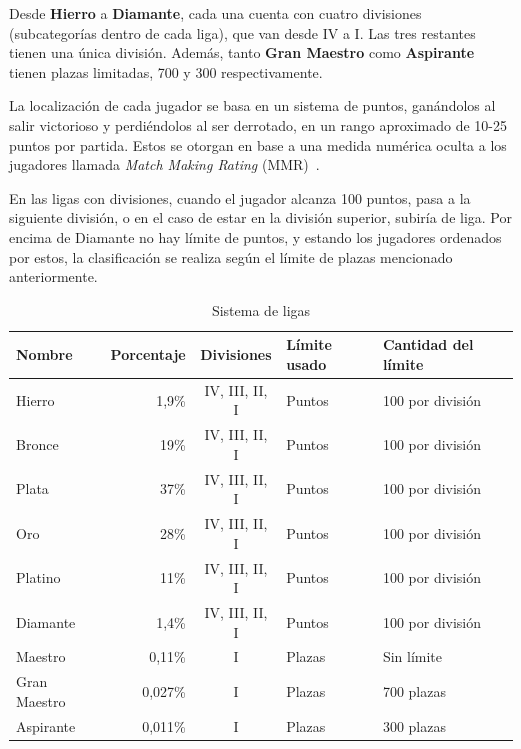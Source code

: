 Desde \textbf{Hierro} a \textbf{Diamante}, cada una cuenta con cuatro divisiones (subcategorías dentro de cada liga), que van desde IV a I. Las tres restantes tienen una única división. Además, tanto \textbf{Gran Maestro} como \textbf{Aspirante} tienen plazas limitadas, 700 y 300 respectivamente.

La localización de cada jugador se basa en un sistema de puntos, ganándolos al salir victorioso y perdiéndolos al ser derrotado, en un rango aproximado de 10-25 puntos por partida. Estos se otorgan en base a una medida numérica oculta a los jugadores llamada \textit{Match Making Rating} (MMR)~\cite{lol_wiki_rank}.

En las ligas con divisiones, cuando el jugador alcanza 100 puntos,  pasa a la siguiente división, o en el caso de estar en la división superior, subiría de liga. Por encima de Diamante no hay límite de puntos, y estando los jugadores ordenados por estos, la clasificación se realiza según el límite de plazas mencionado anteriormente.

\begin{table}[h]
	\begin{tabular}{lrcll}\toprule
		\textbf{Nombre} & \textbf{Porcentaje} & \textbf{Divisiones} & \textbf{Límite usado} & \textbf{Cantidad del límite} \\ \midrule
		Hierro & 1,9\% & IV, III, II, I & Puntos  & 100 por división \\ 
		Bronce & 19\% & IV, III, II, I & Puntos  & 100 por división \\ 
		Plata & 37\% & IV, III, II, I & Puntos  & 100 por división \\ 
		Oro & 28\% & IV, III, II, I & Puntos  & 100 por división \\ 
		Platino & 11\% & IV, III, II, I & Puntos  & 100 por división \\ 
		Diamante & 1,4\% & IV, III, II, I & Puntos  & 100 por división \\ 
		Maestro & 0,11\% & I & Plazas  & Sin límite \\ 
		Gran Maestro & 0,027\% & I & Plazas  & 700 plazas \\ 
		Aspirante & 0,011\% & I & Plazas  & 300 plazas \\ \bottomrule
	\end{tabular}
	\caption{Sistema de ligas}
	\label{tab:ligas}
\end{table}
 

